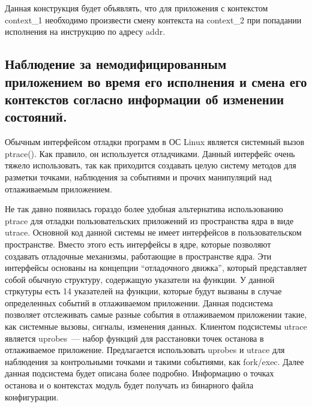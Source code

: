 \bigskip
Данная конструкция будет объявлять, что для приложения
с контекстом context\_1 необходимо произвести смену 
контекста на context\_2 при попадании исполнения на 
инструкцию по адресу addr.
\begin{comment}
Проблема наблюдения за данными адресами может быть реализована 
по-разному. Можно использовать вызов ptrace и создавать 
сложную систему методов для наблюдения за событиями в 
наблюдаемом приложении. При этом, обязательно нужно 
следить за такими событиями, как fork и exec для определения, 
в какое состояние переходит приложения. Так же наблюдение за exec 
обеспечит определение факта запуска определенного приложения. Такой 
контроль предлагается осуществлять при помощи системы utrace и 
ее клиента~--- uprobes. Utrace является патчем ядра от Red 
Hat, позволяющим строить отладочные движки, работающие в 
пространстве ядра в качестве загружаемых модулей. Uprobes 
является клиентом utrace и позволяет устанавливать точки 
останова на определенные адреса в коде и для каждой из них 
регистрировать функции-обработчики, которые будут срабатывать ккаждый 
раз, как управление в приложении попадет на одну из точек останова.
\end{comment} 

\bigskip
\subsection{Наблюдение за немодифицированным 
	приложением во время его исполнения 
	и смена его контекстов согласно 
	информации об изменении состояний.}

\bigskip
Обычным интерфейсом отладки программ в ОС Linux является 
системный вызов ptrace(). Как правило, он используется 
отладчиками. Данный интерфейс очень тяжело использовать, 
так как приходится создавать целую систему методов для 
разметки точками, наблюдения за событиями и прочих манипуляций 
над отлаживаемым приложением. 

Не так давно появилась гораздо более удобная альтернатива 
использованию ptrace для отладки пользовательских 
приложений из пространства ядра в виде utrace. Основной 
код данной системы не имеет интерфейсов в пользовательском 
пространстве. Вместо этого есть интерфейсы в ядре, которые 
позволяют создавать отладочные механизмы, работающие в пространстве 
ядра. Эти интерфейсы основаны на концепции ``отладочного движка'', 
который представляет собой обычную структуру, содержащую 
указатели на функции. У данной стркутуры есть 14 указателей на
функции, которые будут вызваны в случае определенных событий в 
отлаживаемом приложении. Данная подсистема позволяет отслеживать 
самые разные события в отлаживаемом приложении такие, как системные 
вызовы, сигналы, изменения данных. Клиентом подсистемы utrace 
является uprobes~--- набор функций для расстановки точек
останова в отлаживаемое приложение. Предлагается использовать 
uprobes и utrace для наблюдения за контрольными точками и 
такими событиями, как fork/exec. Далее данная подсистема 
будет описана более подробно. Информацию о точках останова 
и о контекстах модуль будет получать из бинарного файла 
конфигурации. 

